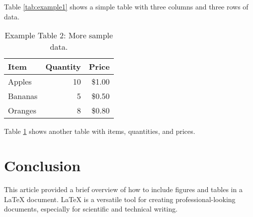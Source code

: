 \documentclass{article}
\begin{document}
Table \ref{tab:example1} shows a simple table with three columns and three rows of data.

\begin{table}[H]
\centering
\caption{Example Table 2: More sample data.}
\begin{tabular}{|l|r|r|}
\hline
\textbf{Item} & \textbf{Quantity} & \textbf{Price} \\
\hline
Apples & 10 & \$1.00 \\
\hline
Bananas & 5 & \$0.50 \\
\hline
Oranges & 8 & \$0.80 \\
\hline
\end{tabular}
\label{tab:example2}
\end{table}

Table \ref{tab:example2} shows another table with items, quantities, and prices.

\section{Conclusion}
This article provided a brief overview of how to include figures and tables in a LaTeX document. LaTeX is a versatile tool for creating professional-looking documents, especially for scientific and technical writing.

\printbibliography
\end{document}

